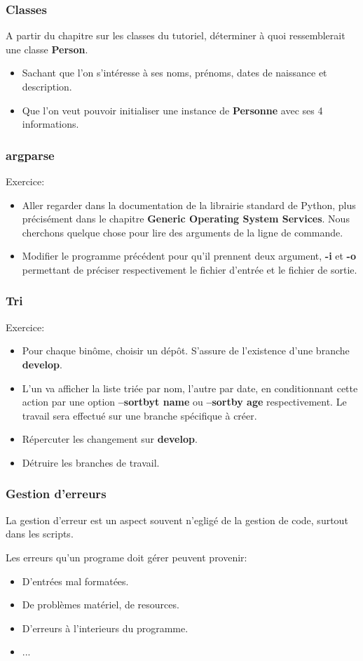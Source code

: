 \documentclass{beamer}
\begin{document}
\begin{frame}\frametitle{Classes}
  A partir du chapitre sur les classes du tutoriel, déterminer à quoi ressemblerait une classe {\bf Person}. 
  \begin{itemize}
  \item Sachant que l'on s'intéresse à ses noms, prénoms, dates de naissance et description.
  \item Que l'on veut pouvoir initialiser une instance de {\bf Personne} avec ses 4 informations.
  \end{itemize}
\end{frame}

\begin{frame}\frametitle{argparse}
  Exercice:
  \begin{itemize}
  \item Aller regarder dans la documentation de la librairie standard de Python, plus précisément dans le chapitre {\bf Generic Operating System Services}. Nous cherchons quelque chose pour lire des arguments de la ligne de commande.
  \item Modifier le programme précédent pour qu'il prennent deux argument, {\bf -i} et {\bf -o} permettant de préciser respectivement le fichier d'entrée et le fichier de sortie. 
  \end{itemize}
\end{frame}

\begin{frame}\frametitle{Tri}
  Exercice:
  \begin{itemize}
  \item Pour chaque binôme, choisir un dépôt. S'assure de l'existence d'une branche {\bf develop}.
  \item L'un va afficher la liste triée par nom, l'autre par date, en conditionnant cette action par une option {\bf --sortbyt name} ou {\bf --sortby age} respectivement. Le travail sera effectué sur une branche spécifique à créer.
  \item Répercuter les changement sur {\bf develop}.
  \item Détruire les branches de travail.
  \end{itemize}
\end{frame}

\begin{frame}\frametitle{Gestion d'erreurs}
  La gestion d'erreur est un aspect souvent n'egligé de la gestion de code, surtout dans les scripts.
  
  Les erreurs qu'un programe doit gérer peuvent provenir:
  \begin{itemize}
  \item D'entrées mal formatées.
  \item De problèmes matériel, de resources.
  \item D'erreurs à l'interieurs du programme.
  \item ...
  \end{itemize}
\end{frame}
\end{document}
